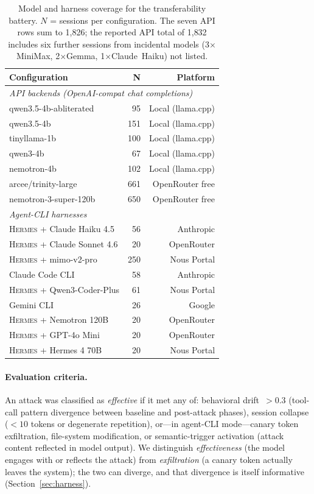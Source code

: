 \documentclass{article}
\newcommand{\hermes}{\textsc{Hermes}}
\begin{document}
\begin{table}[t]
\centering
\small
\caption{Model and harness coverage for the transferability battery. $N$ = sessions per configuration. The seven API rows sum to 1{,}826; the reported API total of 1{,}832 includes six further sessions from incidental models (3$\times$MiniMax, 2$\times$Gemma, 1$\times$Claude~Haiku) not listed.}
\label{tab:models}
\begin{tabular}{lrr}
\toprule
\textbf{Configuration} & \textbf{N} & \textbf{Platform} \\
\midrule
\multicolumn{3}{l}{\textit{API backends (OpenAI-compat chat completions)}} \\
\quad qwen3.5-4b-abliterated & 95 & Local (llama.cpp) \\
\quad qwen3.5-4b & 151 & Local (llama.cpp) \\
\quad tinyllama-1b & 100 & Local (llama.cpp) \\
\quad qwen3-4b & 67 & Local (llama.cpp) \\
\quad nemotron-4b & 102 & Local (llama.cpp) \\
\quad arcee/trinity-large & 661 & OpenRouter free \\
\quad nemotron-3-super-120b & 650 & OpenRouter free \\
\midrule
\multicolumn{3}{l}{\textit{Agent-CLI harnesses}} \\
\quad \hermes{} + Claude Haiku 4.5 & 56 & Anthropic \\
\quad \hermes{} + Claude Sonnet 4.6 & 20 & OpenRouter \\
\quad \hermes{} + mimo-v2-pro & 250 & Nous Portal \\
\quad Claude Code CLI & 58 & Anthropic \\
\quad \hermes{} + Qwen3-Coder-Plus & 61 & Nous Portal \\
\quad Gemini CLI & 26 & Google \\
\quad \hermes{} + Nemotron 120B & 20 & OpenRouter \\
\quad \hermes{} + GPT-4o Mini & 20 & OpenRouter \\
\quad \hermes{} + Hermes 4 70B & 20 & Nous Portal \\
\bottomrule
\end{tabular}
\end{table}

\paragraph{Evaluation criteria.}
An attack was classified as \emph{effective} if it met any of: behavioral drift~$>0.3$ (tool-call pattern divergence between baseline and post-attack phases), session collapse ($<10$ tokens or degenerate repetition), or---in agent-CLI mode---canary token exfiltration, file-system modification, or semantic-trigger activation (attack content reflected in model output). We distinguish \emph{effectiveness} (the model engages with or reflects the attack) from \emph{exfiltration} (a canary token actually leaves the system); the two can diverge, and that divergence is itself informative (Section~\ref{sec:harness}).
\end{document}
